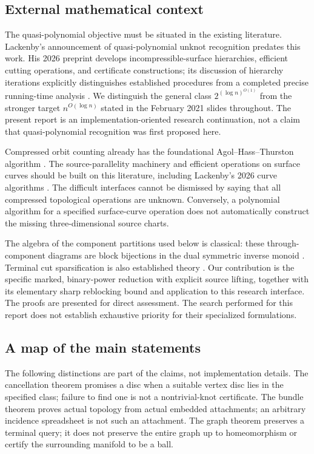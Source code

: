 \subsection{External mathematical context}

The quasi-polynomial objective must be situated in the existing literature.
Lackenby's announcement of quasi-polynomial unknot recognition predates this
work. His 2026 preprint develops incompressible-surface hierarchies, efficient
cutting operations, and certificate constructions; its discussion of hierarchy
iterations explicitly distinguishes established procedures from a completed
precise running-time analysis \cite{lackenby-talk,lackenby2026}.
We distinguish the general class $2^{(\log n)^{O(1)}}$ from the stronger
target $n^{O(\log n)}$ stated in the February 2021 slides throughout.
The present report is an implementation-oriented research continuation, not a
claim that quasi-polynomial recognition was first proposed here.

Compressed orbit counting already has the foundational Agol--Hass--Thurston
algorithm \cite{aht}. The source-parallelity machinery and efficient operations
on surface curves should be built on this literature, including Lackenby's
2026 curve algorithms \cite{lackenby-curves}. The difficult interfaces cannot
be dismissed by saying that all compressed topological operations are unknown.
Conversely, a polynomial algorithm for a specified surface-curve operation
does not automatically construct the missing three-dimensional source charts.

The algebra of the component partitions used below is classical: these
through-component diagrams are block bijections in the dual symmetric inverse
monoid \cite{fitzgerald-leech1998,easdown-east-fitzgerald2008}. Terminal cut
sparsification is also established theory
\cite{hagerup1998,chalermsook2021,liu2023}. Our contribution is the specific
marked, binary-power reduction with explicit source lifting, together with its
elementary sharp reblocking bound and application to this research interface.
The proofs are presented for direct assessment. The search performed for this
report does not establish exhaustive priority for their specialized formulations.

\subsection{A map of the main statements}

The following distinctions are part of the claims, not implementation details.
The cancellation theorem promises a disc when a suitable vertex disc lies in
the specified class; failure to find one is not a nontrivial-knot certificate.
The bundle theorem proves actual topology from actual embedded attachments;
an arbitrary incidence spreadsheet is not such an attachment. The graph theorem
preserves a terminal query; it does not preserve the entire graph up to
homeomorphism or certify the surrounding manifold to be a ball.

